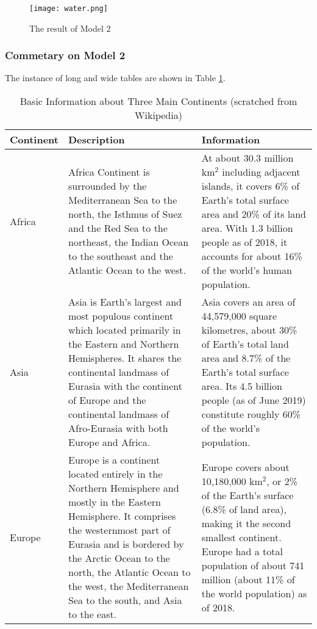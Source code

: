 \documentclass[12pt]{article}  %
\begin{document}
\begin{figure}[htbp]
\centering
\texttt{[image: water.png]}
\caption{The result of Model 2}\label{fig:result}
\end{figure}

\clearpage
\subsubsection{Commetary on Model 2}
The instance of long and wide tables are shown in Table \ref{tb:longtable}.

\begin{longtable}{ p{4em} p{14em} p{14em} }
\caption{Basic Information about Three Main Continents (scratched from Wikipedia)}
\label{tb:longtable}\\
\toprule
Continent & Description & Information \\
\midrule
Africa & Africa Continent is surrounded by the Mediterranean Sea to the
north, the Isthmus of Suez and the Red Sea to the northeast, the Indian
Ocean to the southeast and the Atlantic Ocean to the west. &
At about 30.3 million km$^2$ including adjacent islands, it covers 6\%
of Earth's total surface area and 20\% of its land area. With 1.3
billion people as of 2018, it accounts for about 16\% of the world's
human population. \\
\midrule
Asia & Asia is Earth's largest and most populous continent which
located primarily in the Eastern and Northern Hemispheres.
It shares the continental landmass of Eurasia with the continent
of Europe and the continental landmass of Afro-Eurasia with both
Europe and Africa. &
Asia covers an area of 44,579,000 square kilometres, about 30\%
of Earth's total land area and 8.7\% of the Earth's total surface
area. Its 4.5 billion people (as of June 2019) constitute roughly
60\% of the world's population. \\
\midrule
Europe & Europe is a continent located entirely in the Northern
Hemisphere and mostly in the Eastern Hemisphere. It comprises the
westernmost part of Eurasia and is bordered by the Arctic Ocean to
the north, the Atlantic Ocean to the west, the Mediterranean Sea to
the south, and Asia to the east. &
Europe covers about 10,180,000 km$^2$, or 2\% of the Earth's surface
(6.8\% of land area), making it the second smallest
continent. Europe had a total population of about 741 million (about
11\% of the world population) as of 2018. \\
\bottomrule
\end{longtable}
\end{document}
